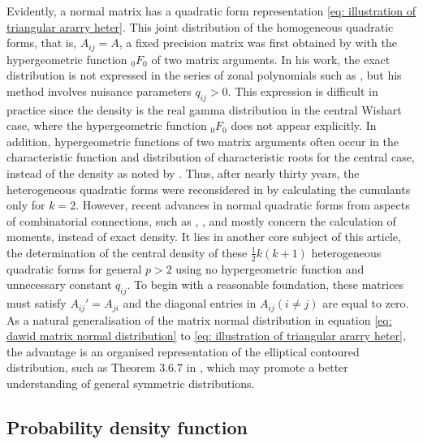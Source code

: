 \documentclass{amsart}
\theoremstyle{definition}
\numberwithin{equation}{section}
\begin{document}
Evidently, a normal matrix has a quadratic form representation \eqref{eq: illustration of triangular ararry heter}. This joint distribution of the homogeneous quadratic forms, that is, $A_{ij} = A$, a fixed precision matrix was first obtained by \cite{khatri1966} with the hypergeometric function ${}_0F_0$ of two matrix arguments.  In his work, the exact distribution is not expressed in the series of zonal polynomials such as \cite{Kotz1967ab}, but his method involves nuisance parameters $q_{ij} >0$. This expression is difficult in practice since the density is the real gamma distribution in the central Wishart case, where the hypergeometric function ${}_0F_0$ does not appear explicitly. In addition, hypergeometric functions of two matrix arguments often occur in the characteristic function and distribution of characteristic roots for the central case, instead of the density as noted by \cite{james1964distribution}. Thus, after nearly thirty years, the heterogeneous quadratic forms were reconsidered in \cite{Mathai1992} by calculating the cumulants only for $k=2$. However, recent advances in normal quadratic forms from aspects of combinatorial connections, such as \cite{hanlon1992combinatorial}, \cite{gouldenandjackson1995}, and \cite{vassilieva2015moments} mostly concern the calculation of moments, instead of exact density. It lies in another core subject of this article, the determination of the central density of these $\frac{1}{2}k(k+1)$ heterogeneous quadratic forms for general $p>2$ using no hypergeometric function and unnecessary constant $q_{ij}$. To begin with a reasonable foundation, these matrices must satisfy $A_{ij}' = A_{ji}$ and the diagonal entries in $A_{ij}(i\neq j)$ are equal to zero.  As a natural generalisation of the matrix normal distribution in equation \eqref{eq: dawid matrix normal distribution} to \eqref{eq: illustration of triangular ararry heter}, the advantage is an organised representation of the elliptical contoured distribution, such as Theorem 3.6.7 in \cite{1990Generalized}, which may promote a better understanding of general symmetric distributions. %
\subsection{Probability density function}
\end{document}
